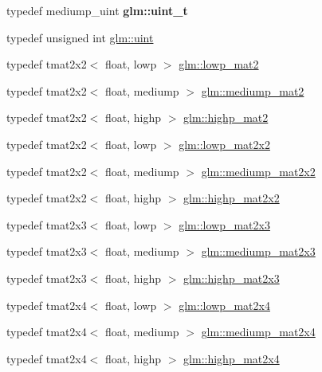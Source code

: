 \begin{DoxyCompactItemize}
\item 
\hypertarget{group__core__precision_ga5f2ae871c284c9d39ae8fdbb1305b566}{typedef mediump\-\_\-uint {\bfseries glm\-::uint\-\_\-t}}\label{group__core__precision_ga5f2ae871c284c9d39ae8fdbb1305b566}

\item 
typedef unsigned int \hyperlink{group__core__precision_ga4fd29415871152bfb5abd588334147c8}{glm\-::uint}
\item 
typedef tmat2x2$<$ float, lowp $>$ \hyperlink{group__core__precision_ga2eb6d28afe554e1a2ebc79e3201e8651}{glm\-::lowp\-\_\-mat2}
\item 
typedef tmat2x2$<$ float, mediump $>$ \hyperlink{group__core__precision_ga3b83486a767447bf1b36bbf32e589bac}{glm\-::mediump\-\_\-mat2}
\item 
typedef tmat2x2$<$ float, highp $>$ \hyperlink{group__core__precision_ga8539ada9351e0a74964fa23c040246cf}{glm\-::highp\-\_\-mat2}
\item 
typedef tmat2x2$<$ float, lowp $>$ \hyperlink{group__core__precision_ga764ca10ac431c7306adaf9e134795919}{glm\-::lowp\-\_\-mat2x2}
\item 
typedef tmat2x2$<$ float, mediump $>$ \hyperlink{group__core__precision_ga7f27d5d720010e94d8a98eaaaf7f1f32}{glm\-::mediump\-\_\-mat2x2}
\item 
typedef tmat2x2$<$ float, highp $>$ \hyperlink{group__core__precision_ga20b66861ebdfa14586f4028c5ef16d2e}{glm\-::highp\-\_\-mat2x2}
\item 
typedef tmat2x3$<$ float, lowp $>$ \hyperlink{group__core__precision_ga9fb4a4c96e13e4954bff1af2f99408cb}{glm\-::lowp\-\_\-mat2x3}
\item 
typedef tmat2x3$<$ float, mediump $>$ \hyperlink{group__core__precision_ga39eba94b5dc46f46481c9c4428609731}{glm\-::mediump\-\_\-mat2x3}
\item 
typedef tmat2x3$<$ float, highp $>$ \hyperlink{group__core__precision_ga96ec9c154598fcc1c113d9ebd3680097}{glm\-::highp\-\_\-mat2x3}
\item 
typedef tmat2x4$<$ float, lowp $>$ \hyperlink{group__core__precision_gafb9e8f974dd69b38b5acc16989882aa0}{glm\-::lowp\-\_\-mat2x4}
\item 
typedef tmat2x4$<$ float, mediump $>$ \hyperlink{group__core__precision_ga61617ba8393bbebc94ee813403aa54a9}{glm\-::mediump\-\_\-mat2x4}
\item 
typedef tmat2x4$<$ float, highp $>$ \hyperlink{group__core__precision_ga74ae75c71c8c2b775714fb24454d6096}{glm\-::highp\-\_\-mat2x4}
\item 

\end{DoxyCompactItemize}
